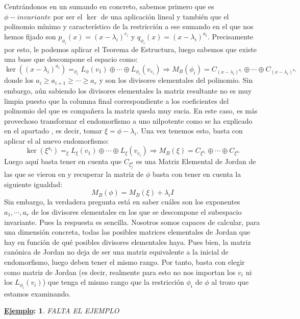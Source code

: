 \documentclass[10pt,a4paper,openright]{book}
\theoremstyle{break}
\newtheorem*{ej}{\underline{Ejemplo}:}
\begin{document}
Centrándonos en un sumando en concreto, sabemos primero que es $\phi-invariante$ por ser el $\ker$ de una aplicación lineal y también que el polinomio mínimo y característico de la restricción a ese sumando en el que nos hemos fijado son $p_{\phi_i}(x) = (x-\lambda_i)^{e_i}$ y $q_{\phi_i}(x)= (x-\lambda_i)^{a_i}$. Precisamente por esto, le podemos aplicar el Teorema de Estructura, luego sabemos que existe una base que descompone el espacio como:
$$\ker\left((x-\lambda_i)^{a_i}\right) =_{\phi_i} L_\phi(v_1)\oplus \cdots \oplus L_{\phi_i}(v_{e_i}) \Rightarrow M_B(\phi_i) = C_{(x-\lambda_i)^{a_i}} \oplus \cdots \oplus C_{(x-\lambda_i)^{a_r}}$$
donde los $a_i \geq a_{i+1}\geq \cdots \geq a_{r}$ y son los divisores elementales del polinomio. Sin embargo, aún sabiendo los divisores elementales la matriz resultante no es muy limpia puesto que la columna final correspondiente a los coeficientes del polinomio del que es compañera la matriz queda muy sucia. En este caso, es más provechoso transformar el endomorfismo a uno nilpotente como se ha explicado en el apartado , es decir, tomar $\xi = \phi- \lambda_i$. Una vez tenemos esto, basta con aplicar el  al nuevo endomorfismo:
$$\ker\left(\xi^{a_i}\right) =_{\xi} L_\xi(v_1)\oplus \cdots \oplus L_{\xi}(v_{e_i}) \Rightarrow M_B(\xi) = C_{\xi^{a_i}} \oplus \cdots \oplus C_{\xi^{a_r}}$$
Luego aquí basta tener en cuenta que $C_{\xi^a_j}$ es una Matriz Elemental de Jordan de las que se vieron en  y recuperar la matriz de $\phi$ basta con tener en cuenta la siguiente igualdad:
$$M_B(\phi) = M_B(\xi) + \lambda_i I$$
Sin embargo, la verdadera pregunta está en saber cuáles son los exponentes $a_1, \cdots, a_r$ de los divisores elementales en los que se descompone el subespacio invariante. Pues la respuesta es sencilla. Nosotros somos capaces de calcular, para una dimensión concreta, todas las posibles matrices elementales de Jordan que hay en función de qué posibles divisores elementales haya. Pues bien, la matriz canónica de Jordan no deja de ser una matriz equivalente a la inicial de endomorfismo, luego deben tener el mismo rango. Por tanto, basta con elegir como matriz de Jordan (es decir, realmente para esto no nos importan los $v_i$ ni los $L_{\phi_i}(v_i)$) que tenga el mismo rango que la restricción $\phi_i$ de $\phi$ al trozo que estamos examinando.

\begin{ej}
FALTA EL EJEMPLO
\end{ej}
\end{document}
